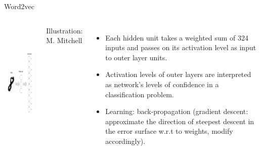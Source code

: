 \documentclass[
  10pt,
  ignorenonframetext,
  x11names, dvipsnames, bibspacing,natbib, table]{beamer}
\begin{document}
\begin{frame}{Word2vec}
\protect\hypertarget{word2vec-3}{}
\begin{columns}
    
    

\begin{center}
 \includegraphics[height = 6cm, width = 5cm]{images/perceptron2.png}
\end{center}


\vspace{-3mm}
\tiny \hfill \color{gray}Illustration: M. Mitchell \color{black}




\footnotesize 

\begin{itemize}
\item Each hidden unit takes a weighted sum of 324 inputs and passes on its activation level as input to outer layer units. 

\item Activation levels of outer layers are interpreted as network's levels of confidence in a classification problem.

\item Learning: back-propagation (gradient descent: approximate  the direction of steepest descent in the error surface w.r.t to weights, modify accordingly).
\end{itemize}

\end{columns}
\end{frame}
\end{document}
